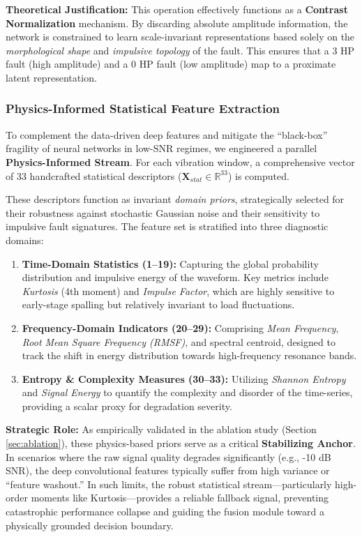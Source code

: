 \documentclass[5p,times,twocolumn]{elsarticle}
\begin{document}
\textbf{Theoretical Justification:} This operation effectively functions as a \textbf{Contrast Normalization} mechanism. By discarding absolute amplitude information, the network is constrained to learn scale-invariant representations based solely on the \textit{morphological shape} and \textit{impulsive topology} of the fault. This ensures that a 3 HP fault (high amplitude) and a 0 HP fault (low amplitude) map to a proximate latent representation.

\subsubsection{Physics-Informed Statistical Feature Extraction}
To complement the data-driven deep features and mitigate the ``black-box'' fragility of neural networks in low-SNR regimes, we engineered a parallel \textbf{Physics-Informed Stream}. For each vibration window, a comprehensive vector of 33 handcrafted statistical descriptors ($\mathbf{X}_{stat} \in \mathbb{R}^{33}$) is computed.

These descriptors function as invariant \textit{domain priors}, strategically selected for their robustness against stochastic Gaussian noise and their sensitivity to impulsive fault signatures. The feature set is stratified into three diagnostic domains:

\begin{enumerate}
    \item \textbf{Time-Domain Statistics (1--19):} Capturing the global probability distribution and impulsive energy of the waveform. Key metrics include \textit{Kurtosis} (4th moment) and \textit{Impulse Factor}, which are highly sensitive to early-stage spalling but relatively invariant to load fluctuations.
    \item \textbf{Frequency-Domain Indicators (20--29):} Comprising \textit{Mean Frequency}, \textit{Root Mean Square Frequency (RMSF)}, and spectral centroid, designed to track the shift in energy distribution towards high-frequency resonance bands.
    \item \textbf{Entropy \& Complexity Measures (30--33):} Utilizing \textit{Shannon Entropy} and \textit{Signal Energy} to quantify the complexity and disorder of the time-series, providing a scalar proxy for degradation severity.
\end{enumerate}

\textbf{Strategic Role:} As empirically validated in the ablation study (Section \ref{sec:ablation}), these physics-based priors serve as a critical \textbf{Stabilizing Anchor}. In scenarios where the raw signal quality degrades significantly (e.g., -10 dB SNR), the deep convolutional features typically suffer from high variance or ``feature washout.'' In such limits, the robust statistical stream—particularly high-order moments like Kurtosis—provides a reliable fallback signal, preventing catastrophic performance collapse and guiding the fusion module toward a physically grounded decision boundary.
\end{document}
